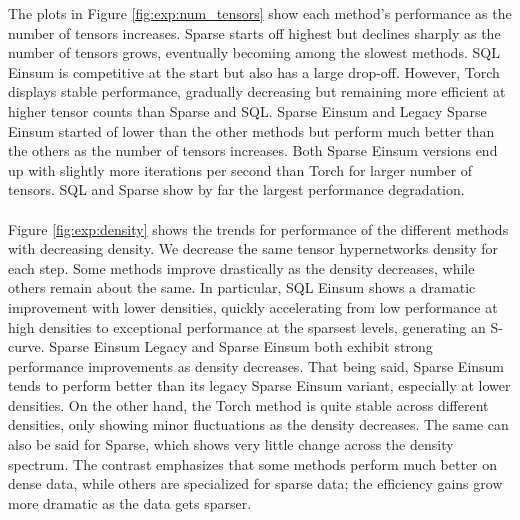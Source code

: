 \noindent
The plots in Figure \ref{fig:exp:num_tensors} show each method's performance as the number
of tensors increases. Sparse starts off highest but declines sharply as the number of tensors
grows, eventually becoming among the slowest methods. SQL Einsum is competitive at the start
but also has a large drop-off. However, Torch displays stable performance, gradually
decreasing but remaining more efficient at higher tensor counts than Sparse and SQL.
Sparse Einsum and Legacy Sparse Einsum started of lower than the other methods but perform
much better than the others as the number of tensors increases. Both Sparse Einsum versions
end up with slightly more iterations per second than Torch for larger number of tensors.
SQL and Sparse show by far the largest performance degradation.
\\
\\
Figure \ref{fig:exp:density} shows the trends for performance of the different methods with
decreasing density. We decrease the same tensor hypernetworks density for each step. Some methods
improve drastically as the density decreases, while others remain about the same. In particular,
SQL Einsum shows a dramatic improvement with lower densities, quickly accelerating from low
performance at high densities to exceptional performance at the sparsest levels, generating an
S-curve. Sparse Einsum Legacy and Sparse Einsum both exhibit strong performance improvements as
density decreases. That being said, Sparse Einsum tends to perform better than its legacy Sparse
Einsum variant, especially at lower densities. On the other hand, the Torch method is quite stable
across different densities, only showing minor fluctuations as the density decreases. The same can
also be said for Sparse, which shows very little change across the density spectrum. The contrast
emphasizes that some methods perform much better on dense data, while others are specialized
for sparse data; the efficiency gains grow more dramatic as the data gets sparser.

